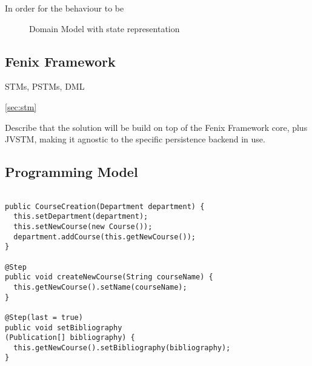 \documentclass{llncs}
\begin{document}
In order for the behaviour to be 

\begin{figure}
\centering
{}

\caption{Domain Model with state representation} 
\label{fig:transactionalContext}

\end{figure}


\subsection{Fenix Framework}

STMs, PSTMs, DML

\ref{sec:stm}

Describe that the solution will be build on top of the Fenix Framework
core, plus JVSTM, making it agnostic to the specific persistence
backend in use. 



\subsection{Programming Model}

\begin{lstlisting}

public CourseCreation(Department department) {
  this.setDepartment(department);
  this.setNewCourse(new Course());
  department.addCourse(this.getNewCourse());
}

@Step
public void createNewCourse(String courseName) {
  this.getNewCourse().setName(courseName);
}

@Step(last = true)
public void setBibliography
(Publication[] bibliography) {
  this.getNewCourse().setBibliography(bibliography);
}
\end{lstlisting}
\end{document}
